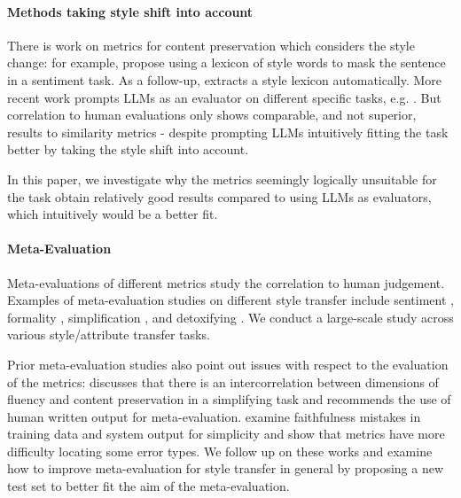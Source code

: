 \paragraph{Methods taking style shift into account}
There is work on metrics for content preservation which considers the style change: for example, \citet{mir-etal-2019-evaluating} propose using a lexicon of style words to mask the sentence in a sentiment task. As a follow-up,  \citet{yu-etal-2021-rethinking-sentiment} extracts a style lexicon automatically. More recent work prompts LLMs as an evaluator on different specific tasks, e.g. \cite{zeng2024bat,lai2023multidimensional,ostheimer-etal-2024-text}. But correlation to human evaluations only shows comparable, and not superior, results to similarity metrics \cite{lai2023multidimensional,ostheimer-etal-2024-text} - despite prompting LLMs intuitively fitting the task better by taking the style shift into account. 

In this paper, we investigate why the metrics seemingly logically unsuitable for the task obtain relatively good results compared to using LLMs as evaluators, which intuitively would be a better fit.

\paragraph{Meta-Evaluation}
Meta-evaluations of different metrics study the correlation to human judgement. Examples of meta-evaluation studies on different style transfer include sentiment \cite{yu-etal-2021-rethinking-sentiment,mir-etal-2019-evaluating,ostheimer-etal-2024-text}, formality \cite{briakou-etal-2021-evaluating,lai-etal-2022-human}, simplification  \cite{scialom2021rethinking, alva-manchego-etal-2021-un, cao-etal-2020-expertise}, and detoxifying \cite{logacheva-etal-2022-study}. We conduct a large-scale study across various style/attribute transfer tasks.

Prior meta-evaluation studies also point out issues with respect to the evaluation of the metrics: \citet{scialom2021rethinking} discusses that there is an intercorrelation between dimensions of fluency and content preservation in a simplifying task and recommends the use of human written output for meta-evaluation. \citet{devaraj-etal-2022-evaluating} examine faithfulness mistakes in training data and system output for simplicity and show that metrics have more difficulty locating some error types. We follow up on these works and examine how to improve meta-evaluation for style transfer in general by proposing a new test set to better fit the aim of the meta-evaluation. 

